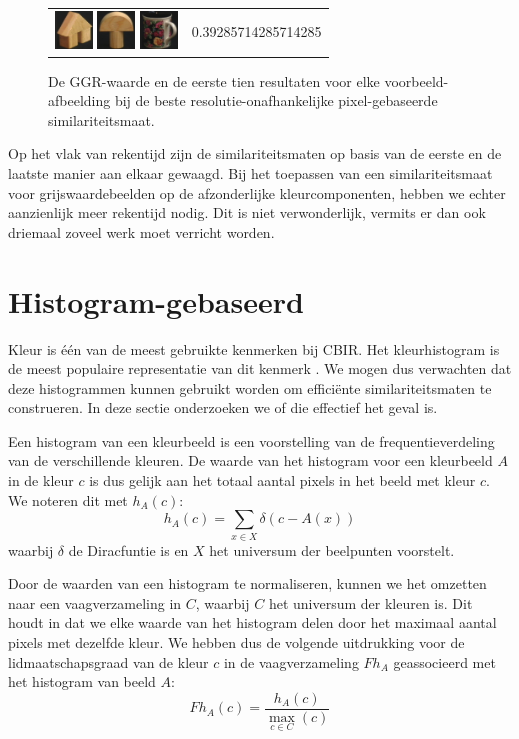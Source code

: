 \begin{figure}[tbp]
\begin{center}
\begin{tabular}{m{11cm} | m{3cm} |}
\includegraphics[width=1cm]{coil/beeld-45.eps}
\includegraphics[width=1cm]{coil/beeld-0.eps}
\includegraphics[width=1cm]{coil/beeld-64.eps}
& {\scriptsize 0.39285714285714285}
\end{tabular}
\caption{\label{fig:results_beste_pixelgeb}De GGR-waarde en de eerste tien resultaten voor elke voorbeeld-afbeelding bij de beste resolutie-onafhankelijke pixel-gebaseerde similariteitsmaat.}
\end{center}
\end{figure}

Op het vlak van rekentijd zijn de similariteitsmaten op basis van de eerste en de laatste manier
aan elkaar gewaagd. Bij het toepassen van een similariteitsmaat voor grijswaardebeelden op de 
afzonderlijke kleurcomponenten, hebben we echter aanzienlijk meer rekentijd nodig. Dit is niet
verwonderlijk, vermits er dan ook driemaal zoveel werk moet verricht worden.


\section{Histogram-gebaseerd}

Kleur is \'e\'en van de meest gebruikte kenmerken bij CBIR. Het kleurhistogram is de meest 
populaire representatie van dit kenmerk \cite{rui:image_retr}. We mogen dus verwachten
dat deze histogrammen kunnen gebruikt worden om effici\"ente similariteitsmaten te construeren.
In deze sectie onderzoeken we of die effectief het geval is. 

Een histogram van een kleurbeeld is een voorstelling van de frequentieverdeling van de
verschillende kleuren. De waarde van het histogram voor een kleurbeeld $A$ in de kleur $c$ is
dus gelijk aan het totaal aantal pixels in het beeld met kleur $c$. We noteren dit met $h_A(c)$:
$$
h_A(c) = \sum_{x \in X} \delta (c - A(x))
$$
waarbij $\delta$ de Diracfuntie is en $X$ het universum der beelpunten voorstelt. 

Door de waarden van een histogram te normaliseren, kunnen we het omzetten naar een 
vaagverzameling in $C$, waarbij $C$ het universum der kleuren is. Dit houdt in dat we elke
waarde van het histogram delen door het maximaal aantal pixels met dezelfde kleur. 
We hebben dus de volgende uitdrukking voor de lidmaatschapsgraad van de kleur $c$ in de 
vaagverzameling $Fh_A$ geassocieerd met het histogram van beeld $A$:
$$
Fh_A(c) = \frac{\displaystyle h_A(c)}{\displaystyle \max_{c \in C}(c)}
$$

